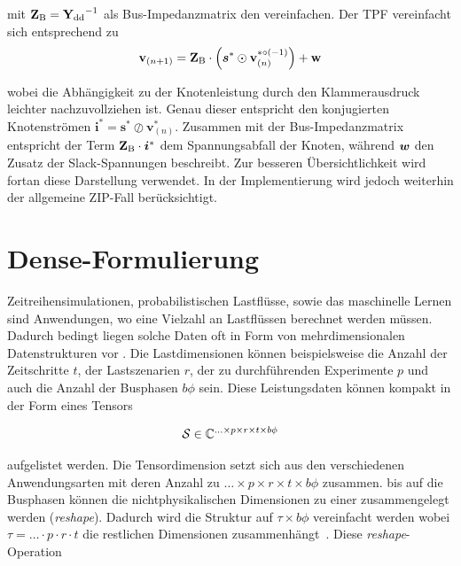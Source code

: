 mit $\mathbf{\mathbf{Z}_\mathrm{B}} = \mathbf{\mathbf{Y}_{\mathrm{dd}}}^{-1}$ als Bus-Impedanzmatrix den vereinfachen.
Der TPF vereinfacht sich entsprechend zu 
\begin{equation}
	\mathbf{v}_{(n+1)} = \mathbf{Z}_\mathrm{B} \cdot \left(\boldsymbol{s}^* \odot \mathbf{v}_{(n)}^{*{\circ(-1)}}\right) + \mathbf{w}
	\label{eq:tpf_konstP}
\end{equation}

wobei die Abhängigkeit zu der Knotenleistung durch den Klammerausdruck leichter nachzuvollziehen ist.
Genau dieser entspricht den konjugierten Knotenströmen $\mathbf{i}^* = \mathbf{s}^* \oslash \mathbf{v}_{(n)}^*$.
Zusammen mit der Bus-Impedanzmatrix entspricht der Term $\mathbf{Z}_\mathrm{B} \cdot \boldsymbol{i}^*$ dem Spannungsabfall der Knoten, während $\boldsymbol{w}$ den Zusatz der Slack-Spannungen beschreibt.
Zur besseren Übersichtlichkeit wird fortan diese Darstellung verwendet.
In der Implementierung wird jedoch weiterhin der allgemeine ZIP-Fall berücksichtigt.


\section{Dense-Formulierung}
\label{sec:tpf_formulierungen}

Zeitreihensimulationen, probabilistischen Lastflüsse, sowie das maschinelle Lernen sind Anwendungen, wo eine Vielzahl an Lastflüssen berechnet werden müssen.
Dadurch bedingt liegen solche Daten oft in Form von mehrdimensionalen Datenstrukturen vor \cite{Salazar2024, Sandoval.2020, SandovalGuzman.2022, Zhang.2015}.
Die Lastdimensionen können beispielsweise die Anzahl der Zeitschritte $t$, der Lastszenarien $r$, der zu durchführenden Experimente $p$ und auch die Anzahl der Busphasen $b\phi$ sein. 
Diese Leistungsdaten können kompakt in der Form eines Tensors 

\begin{equation}
	\mathcal{S} \in \mathbb{C}^{\ldots \times p \times r \times t \times b\phi}
	\label{eq:tensor_S}
\end{equation}

aufgelistet werden. 
Die Tensordimension setzt sich aus den verschiedenen Anwendungsarten mit deren Anzahl zu $\ldots \times p \times r \times t \times b\phi$ zusammen.
bis auf die Busphasen können die nichtphysikalischen Dimensionen zu einer zusammengelegt werden (\emph{reshape}).
Dadurch wird die Struktur auf $\tau \times b\phi$ vereinfacht werden wobei $\tau = \ldots \cdot p \cdot r \cdot t$ die restlichen Dimensionen zusammenhängt~\cite{Salazar2024}.
Diese \emph{reshape}-Operation 

